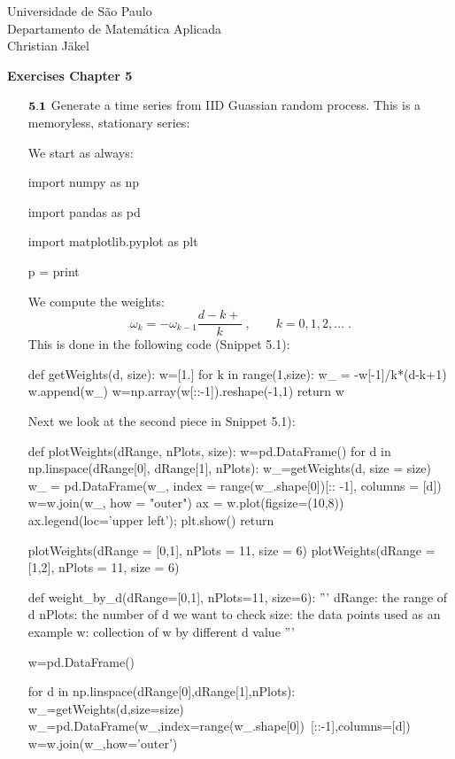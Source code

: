 \documentclass{letter}
\begin{document}
Universidade de S\~ao Paulo \\
Departamento de Matem\'atica Aplicada\\
Christian J\"akel

\bigskip
\centerline{\bf Exercises Chapter 5}

\bigskip
\begin{itemize}

\item[${\bf 5.1}$] Generate a time series from IID Guassian random process. 
This is a memoryless, stationary series: 

\bigskip
We start as always:

\bigskip
\color{blue}
import numpy as np

import pandas as pd

import matplotlib.pyplot as plt

p = print
\color{black}

\bigskip
We compute the weights: 
	\[
		\omega_k = - \omega_{k-1} \frac{d-k+}{k} \; , \qquad k = 0, 1, 2, \ldots \; .    
	\]
This is done in the following code (Snippet 5.1): 

\color{blue}
def getWeights(d, size):
    w=[1.]
    for k in range(1,size):
        w_ = -w[-1]/k*(d-k+1)
        w.append(w_)
    w=np.array(w[::-1]).reshape(-1,1)
    return w


\color{black}

\bigskip
Next we look at the second piece in Snippet 5.1): 

\color{blue}
def plotWeights(dRange, nPlots, size):
    w=pd.DataFrame()
    for d in np.linspace(dRange[0], dRange[1], nPlots):
        w_=getWeights(d, size = size)
        w_ = pd.DataFrame(w_, index = range(w_.shape[0])[:: -1], columns = [d])
        w=w.join(w_, how = "outer")
    ax = w.plot(figsize=(10,8))
    ax.legend(loc='upper left'); plt.show()
    return
 

plotWeights(dRange = [0,1], nPlots = 11, size = 6)
plotWeights(dRange = [1,2], nPlots = 11, size = 6)


def weight_by_d(dRange=[0,1], nPlots=11, size=6):
    '''
    dRange: the range of d
    nPlots: the number of d we want to check
    size: the data points used as an example
    w: collection of w by different d value
    '''
    
    w=pd.DataFrame()
    
    for d in np.linspace(dRange[0],dRange[1],nPlots):
        w_=getWeights(d,size=size)
        w_=pd.DataFrame(w_,index=range(w_.shape[0])\
        [::-1],columns=[d])
        w=w.join(w_,how='outer')
        

\end{itemize}
\end{document}
